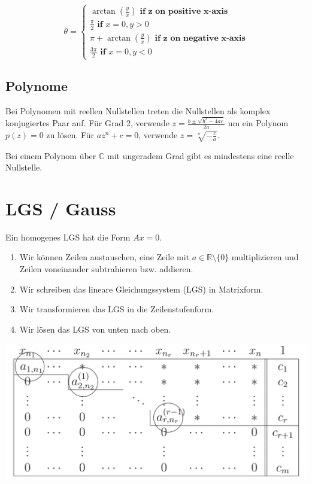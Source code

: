 \documentclass[a4paper,10pt]{article}
\begin{document}
$$
\theta = \begin{cases}
  \arctan(\frac{y}{x}) \textbf{ if z on positive x-axis}\\
  \frac{\pi}{2} \textbf{ if }x=0, y > 0\\
  \pi + \arctan(\frac{y}{x}) \textbf{ if z on negative x-axis}\\
  \frac{3\pi}{2} \textbf{ if }x=0, y < 0
\end{cases}
$$

\subsection{Polynome}

Bei Polynomen mit reellen Nullstellen treten die Nullstellen als komplex konjugiertes Paar auf. Für Grad 2, verwende $z = \frac{b \pm \sqrt{b^2 - 4ac}}{2a}$ um ein Polynom $p(z) = 0$ zu lösen. Für $a z^n + c = 0$, verwende $z = \sqrt[n]{-\frac{c}{a}}$.

Bei einem Polynom über $\mathbb{C}$ mit ungeradem Grad gibt es mindestens eine reelle Nullstelle.

\section{LGS / Gauss}

Ein homogenes LGS hat die Form $Ax = 0$.

\begin{enumerate}
  \item Wir können Zeilen austauschen, eine Zeile mit $a \in \mathbb{R}\setminus \{0\}$ multiplizieren und Zeilen voneinander subtrahieren bzw. addieren.
  \item Wir schreiben das lineare Gleichungssystem (LGS) in Matrixform.
  \item Wir transformieren das LGS in die Zeilenstufenform.
  \item Wir lösen das LGS von unten nach oben.
\end{enumerate}

\begin{center}
  \includegraphics[width=\linewidth]{gauss.png}
\end{center}
\end{document}
